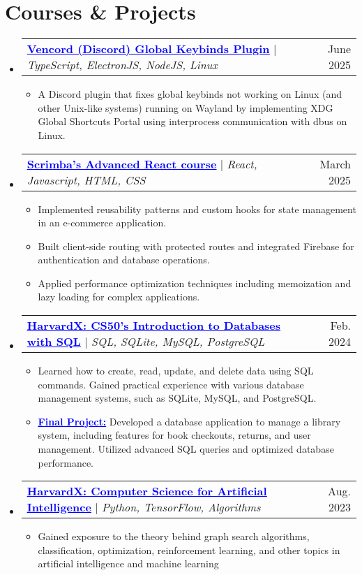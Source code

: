 \documentclass[letterpaper,11pt]{article}
\makeatletter
\newcommand{\resumeItem}[1]{
  \item\small{
    {#1 \vspace{-2pt}}
  }
}
\newcommand{\resumeProjectHeading}[2]{
    \item
    \begin{tabular*}{0.97\textwidth}{l@{\extracolsep{\fill}}r}
      \small#1 & #2 \\
    \end{tabular*}\vspace{-7pt}
}
\newcommand{\resumeSubHeadingListStart}{\begin{itemize}[leftmargin=0.15in, label={}]}
\newcommand{\resumeSubHeadingListEnd}{\end{itemize}}
\newcommand{\resumeItemListStart}{\begin{itemize}}
\newcommand{\resumeItemListEnd}{\end{itemize}\vspace{-5pt}}
\makeatother
\begin{document}
\section{Courses \& Projects}
    \resumeSubHeadingListStart
      \resumeProjectHeading
      {\href{https://github.com/KhalidAlansary/Vencord}{\textcolor{blue}{\underline{\textbf{Vencord (Discord) Global Keybinds Plugin}}}} $|$ \emph{TypeScript, ElectronJS, NodeJS, Linux}}{June 2025}
      \resumeItemListStart
        \resumeItem{A Discord plugin that fixes global keybinds not working on Linux (and other Unix-like systems) running on Wayland by implementing XDG Global Shortcuts Portal using interprocess communication with dbus on Linux.}
      \resumeItemListEnd
      \resumeProjectHeading
          {\href{https://scrimba.com/certificate-cert2JbLs3qgAvqsGYGNk8Lo7ZwuaExT36m3wCB6rR}{\textcolor{blue}{\underline{\textbf{Scrimba's Advanced React course}}}} $|$ \emph{React, Javascript, HTML, CSS}}{March 2025}
          \resumeItemListStart
            \resumeItem{Implemented reusability patterns and custom hooks for state management in an e-commerce application.}
            \resumeItem{Built client-side routing with protected routes and integrated Firebase for authentication and database operations.}
            \resumeItem{Applied performance optimization techniques including memoization and lazy loading for complex applications.}
          \resumeItemListEnd
      \resumeProjectHeading
          {\href{https://certificates.cs50.io/b41cb19f-0117-4da6-af42-80cfa762c907.pdf}{\textcolor{blue}{\underline{\textbf{HarvardX: CS50’s Introduction to Databases with SQL}}}} $|$ \emph{SQL, SQLite, MySQL, PostgreSQL}}{Feb. 2024}
          \resumeItemListStart
            \resumeItem{Learned how to create, read, update, and delete data using SQL commands. Gained practical experience with various database management systems, such as SQLite, MySQL, and PostgreSQL.}
            \resumeItem{\textbf{\href{https://github.com/KhalidAlansary/CS50SQL-Final-Project}{\textcolor{blue}{\underline{Final Project:}}}} Developed a database application to manage a library system, including features for book checkouts, returns, and user management. Utilized advanced SQL queries and optimized database performance.}
          \resumeItemListEnd
      \resumeProjectHeading
          {\href{https://credentials.edx.org/credentials/a45ff39483ed4a8db7a6a667b469e3f8}{\textcolor{blue}{\underline{\textbf{HarvardX: Computer Science for Artificial Intelligence}}}} $|$ \emph{Python, TensorFlow, Algorithms}}{Aug. 2023}
          \resumeItemListStart
            \resumeItem{Gained exposure to the theory behind graph search algorithms, classification, optimization, reinforcement learning, and other topics in artificial intelligence and machine learning}
          \resumeItemListEnd
    \resumeSubHeadingListEnd
\end{document}
